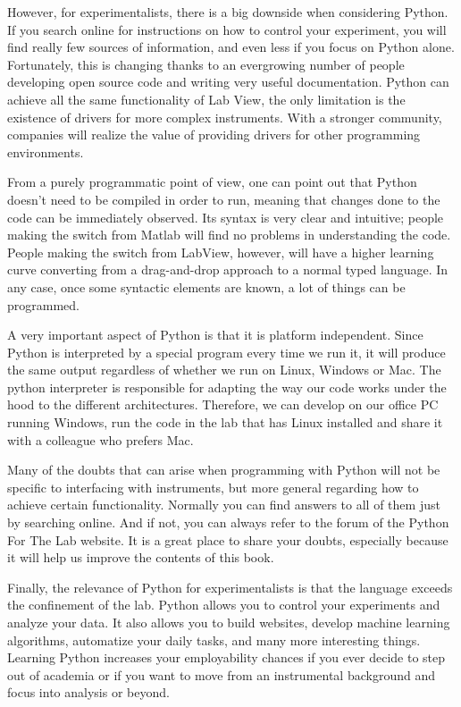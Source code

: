 However, for experimentalists, there is a big downside when considering Python. If you search online for instructions on how to control your experiment, you will find really few sources of information, and even less if you focus on Python alone. Fortunately, this is changing thanks to an evergrowing number of people developing open source code and writing very useful documentation. Python can achieve all the same functionality of Lab View, the only limitation is the existence of drivers for more complex instruments. With a stronger community, companies will realize the value of providing drivers for other programming environments.

From a purely programmatic point of view, one can point out that Python doesn’t need to be compiled in order to run, meaning that changes done to the code can be immediately observed. Its syntax is very clear and intuitive; people making the switch from Matlab will find no problems in understanding the code. People making the switch from LabView, however, will have a higher learning curve converting from a drag-and-drop approach to a normal typed language. In any case, once some syntactic elements are known, a lot of things can be programmed.

A very important aspect of Python is that it is platform independent. Since Python is interpreted by a special program every time we run it, it will produce the same output regardless of whether we run on Linux, Windows or Mac. The python interpreter is responsible for adapting the way our code works under the hood to the different architectures. Therefore, we can develop on our office PC running Windows, run the code in the lab that has Linux installed and share it with a colleague who prefers Mac.

Many of the doubts that can arise when programming with Python will not be specific to interfacing with instruments, but more general regarding how to achieve certain functionality. Normally you can find answers to all of them just by searching online. And if not, you can always refer to the forum of the Python For The Lab website. It is a great place to share your doubts, especially because it will help us improve the contents of this book. 

Finally, the relevance of Python for experimentalists is that the language exceeds the confinement of the lab. Python allows you to control your experiments and analyze your data. It also allows you to build websites, develop machine learning algorithms, automatize your daily tasks, and many more interesting things. Learning Python increases your employability chances if you ever decide to step out of academia or if you want to move from an instrumental background and focus into analysis or beyond. 

